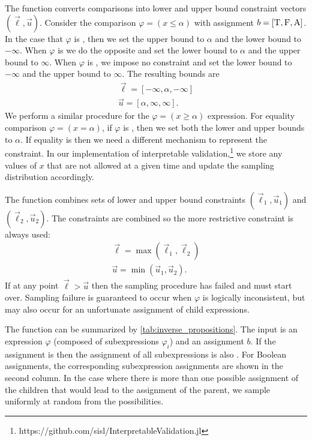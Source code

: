 The function  converts comparisons into lower and upper bound constraint vectors $(\vec{\ell}, \vec{u})$. Consider the comparison $\varphi = (x \leq \alpha)$ with assignment $b = [\textsc{T}, \textsc{F}, \textsc{A}]$. In the case that $\varphi$ is \True{}, then we set the upper bound to $\alpha$ and the lower bound to $-\infty$. When $\varphi$ is \False{} we do the opposite and set the lower bound to $\alpha$ and the upper bound to $\infty$. When $\varphi$ is \Arbitrary{}, we impose no constraint and set the lower bound to $-\infty$ and the upper bound to $\infty$. The resulting bounds are
\begin{align}
    \vec{\ell} = [-\infty, \alpha, -\infty] \\
    \vec{u} = [\alpha, \infty, \infty] \text{.}
\end{align}
We perform a similar procedure for the $\varphi = (x \geq \alpha)$ expression. For equality comparison $\varphi = (x = \alpha)$, if $\varphi$ is \True{}, then we set both the lower and upper bounds to $\alpha$. If equality is \False{} then we need a different mechanism to represent the constraint. In our implementation of interpretable validation,\footnote{https://github.com/sisl/InterpretableValidation.jl} we store any values of $x$ that are not allowed at a given time and update the sampling distribution accordingly. 

The function  combines sets of lower and upper bound constraints $(\vec{\ell}_1, \vec{u}_1)$ and $(\vec{\ell}_2, \vec{u}_2)$. The constraints are combined so the more restrictive constraint is always used:
\begin{align}
\vec{\ell} = \max(\vec{\ell}_1, \vec{\ell}_2) \\
\vec{u} = \min(\vec{u}_1, \vec{u}_2) \text{.}
\end{align}
If at any point $\vec{\ell} > \vec{u}$ then the sampling procedure has failed and must start over. Sampling failure is guaranteed to occur when $\varphi$ is logically inconsistent, but may also occur for an unfortunate assignment of child expressions. 

The function  can be summarized by \cref{tab:inverse_propositions}. The input is an expression $\varphi$ (composed of subexpressions $\varphi_i$) and an assignment $b$. If the assignment is \Arbitrary{} then the assignment of all subexpressions is also \Arbitrary{}. For Boolean assignments, the corresponding subexpression assignments are shown in the second column. In the case where there is more than one possible assignment of the children that would lead to the assignment of the parent, we sample uniformly at random from the possibilities. 


